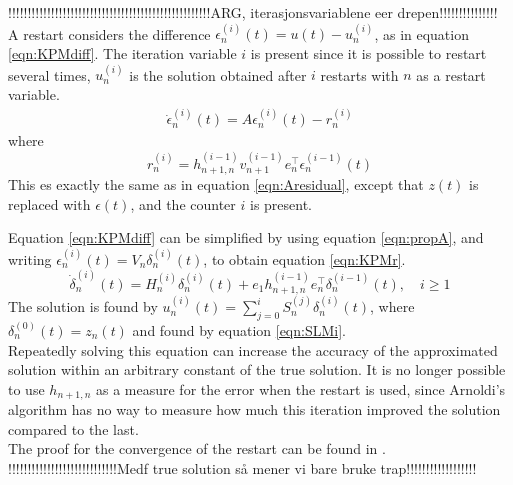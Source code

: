 !!!!!!!!!!!!!!!!!!!!!!!!!!!!!!!!!!!!!!!!!!!!!!!!!!!!ARG, iterasjonsvariablene eer drepen!!!!!!!!!!!!!!!\\
A restart considers the difference $\epsilon_n^{(i)}(t) = u(t)-u_n^{(i)}$, as in equation \eqref{eqn:KPMdiff}. The iteration variable $i$ is present since it is possible to restart several times, $u_n^{(i)}$ is the solution obtained after $i$ restarts with $n$ as a restart variable. 
\begin{equation}
\begin{aligned}
\dot{\epsilon}_n^{(i)}(t)=A \epsilon_n^{(i)} (t)  - r_n^{(i)}
\end{aligned}
\label{eqn:KPMdiff}
\end{equation}
where 
\begin{equation}
r_n^{(i)} = h_{n+1,n}^{(i-1)} v_{n+1}^{(i-1)} e_n^{\top} \epsilon_n^{(i-1)} (t) 
\end{equation}
This es exactly the same as in equation \eqref{eqn:Aresidual}, except that $z(t)$ is replaced with $\epsilon(t)$, and the counter $i$ is present. 

Equation \eqref{eqn:KPMdiff} can be simplified by using equation \eqref{eqn:propA}, and writing $ \epsilon^{(i)}_n(t)  = V_n \delta_n^{(i)}(t) $, to obtain equation \eqref{eqn:KPMr}.
\begin{equation}
\dot{\delta}^{(i)}_n(t) = H_n^{(i)} \delta_n^{(i)}(t) + e_1 h_{n+1,n}^{(i-1)} e^\top_n \delta_n^{(i-1)}(t), \quad i \geq 1
\label{eqn:KPMr}
\end{equation}
The solution is found by $ u_n^{(i)}(t) = \sum \limits_{j = 0} ^i S_n^{(j)} \delta_n^{(i)} (t) $, where $\delta_n^{(0)} (t) = z_n(t)$ and found by equation \eqref{eqn:SLMi}. \\
Repeatedly solving this equation can increase the accuracy of the approximated solution within an arbitrary constant of the true solution. It is no longer possible to use $h_{n+1,n}$ as a measure for the error when the restart is used, since Arnoldi's algorithm has no way to measure how much this iteration improved the solution compared to the last.\\

The proof for the convergence of the restart can be found in \cite{???}.\\
!!!!!!!!!!!!!!!!!!!!!!!!!!!!Medf true solution så mener vi bare bruke trap!!!!!!!!!!!!!!!!!!\\
